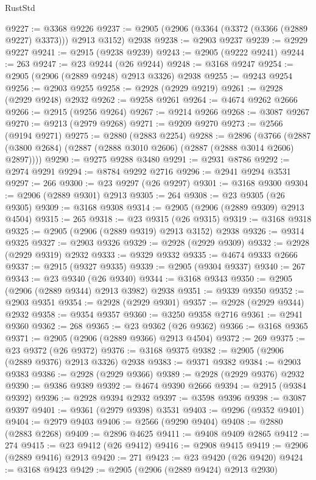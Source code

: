 \begin{lexlean}{RustStd}
\begin{coremodule}
@9227 := @3368 @9226
@9237 := @2905 (@2906 (@3364 (@3372 (@3366 (@2889 @9227) @3373))) @2913 @3152) @2938
@9238 := @2903 @9237
@9239 := @2929 @9227
@9241 := @2915 (@9238 @9239)
@9243 := @2905 (@9222 @9241)
@9244 := 263
@9247 := @23 @9244 (@26 @9244)
@9248 := @3168 @9247
@9254 := @2905 (@2906 (@2889 @9248) @2913 @3326) @2938
@9255 := @9243 @9254
@9256 := @2903 @9255
@9258 := @2928 (@2929 @9219)
@9261 := @2928 (@2929 @9248) @2932
@9262 := @9258 @9261
@9264 := @4674 @9262 @2666
@9266 := @2915 (@9256 @9264)
@9267 := @9214 @9266
@9268 := @3087 @9267
@9270 := @9213 (@2979 @9268)
@9271 := @9209 @9270
@9273 := @2566 (@9194 @9271)
@9275 := @2880 (@2883 @2254)
@9288 := @2896
    (@3766 (@2887 (@3800 @2684) (@2887 (@2888 @3010 @2606) (@2887 (@2888 @3014 @2606) @2897))))
@9290 := @9275 @9288 @3480
@9291 := @2931 @8786
@9292 := @2974 @9291
@9294 := @8784 @9292 @2716
@9296 := @2941 @9294 @3531
@9297 := 266
@9300 := @23 @9297 (@26 @9297)
@9301 := @3168 @9300
@9304 := @2906 (@2889 @9301) @2913
@9305 := 264
@9308 := @23 @9305 (@26 @9305)
@9309 := @3168 @9308
@9314 := @2905 (@2906 (@2889 @9309) @2913 @4504)
@9315 := 265
@9318 := @23 @9315 (@26 @9315)
@9319 := @3168 @9318
@9325 := @2905 (@2906 (@2889 @9319) @2913 @3152) @2938
@9326 := @9314 @9325
@9327 := @2903 @9326
@9329 := @2928 (@2929 @9309)
@9332 := @2928 (@2929 @9319) @2932
@9333 := @9329 @9332
@9335 := @4674 @9333 @2666
@9337 := @2915 (@9327 @9335)
@9339 := @2905 (@9304 @9337)
@9340 := 267
@9343 := @23 @9340 (@26 @9340)
@9344 := @3168 @9343
@9350 := @2905 (@2906 (@2889 @9344) @2913 @3982) @2938
@9351 := @9339 @9350
@9352 := @2903 @9351
@9354 := @2928 (@2929 @9301)
@9357 := @2928 (@2929 @9344) @2932
@9358 := @9354 @9357
@9360 := @3250 @9358 @2716
@9361 := @2941 @9360
@9362 := 268
@9365 := @23 @9362 (@26 @9362)
@9366 := @3168 @9365
@9371 := @2905 (@2906 (@2889 @9366) @2913 @4504)
@9372 := 269
@9375 := @23 @9372 (@26 @9372)
@9376 := @3168 @9375
@9382 := @2905 (@2906 (@2889 @9376) @2913 @3326) @2938
@9383 := @9371 @9382
@9384 := @2903 @9383
@9386 := @2928 (@2929 @9366)
@9389 := @2928 (@2929 @9376) @2932
@9390 := @9386 @9389
@9392 := @4674 @9390 @2666
@9394 := @2915 (@9384 @9392)
@9396 := @2928 @9394 @2932
@9397 := @3598 @9396
@9398 := @3087 @9397
@9401 := @9361 (@2979 @9398) @3531
@9403 := @9296 (@9352 @9401)
@9404 := @2979 @9403
@9406 := @2566 (@9290 @9404)
@9408 := @2880 (@2883 @2268)
@9409 := @2896 @4625
@9411 := @9408 @9409 @2865
@9412 := 274
@9415 := @23 @9412 (@26 @9412)
@9416 := @2908 @9415
@9419 := @2906 (@2889 @9416) @2913
@9420 := 271
@9423 := @23 @9420 (@26 @9420)
@9424 := @3168 @9423
@9429 := @2905 (@2906 (@2889 @9424) @2913 @2930)

\end{coremodule}
\end{lexlean}
